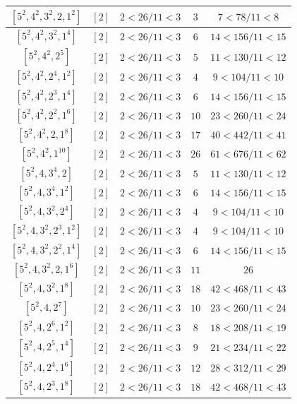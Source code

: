 \documentclass{article}%
\begin{document}
\begin{center}
\begin{longtable}{||c|c|c|c|c||}
$[5^{2}, 4^{2}, 3^{2}, 2, 1^{2}]$ & $[2]$ & $2 < 26/11 < 3$ & $3$ & $7 < 78/11 < 8$ \\ \hline 
$[5^{2}, 4^{2}, 3^{2}, 1^{4}]$ & $[2]$ & $2 < 26/11 < 3$ & $6$ & $14 < 156/11 < 15$ \\ \hline 
$[5^{2}, 4^{2}, 2^{5}]$ & $[2]$ & $2 < 26/11 < 3$ & $5$ & $11 < 130/11 < 12$ \\ \hline 
$[5^{2}, 4^{2}, 2^{4}, 1^{2}]$ & $[2]$ & $2 < 26/11 < 3$ & $4$ & $9 < 104/11 < 10$ \\ \hline 
$[5^{2}, 4^{2}, 2^{3}, 1^{4}]$ & $[2]$ & $2 < 26/11 < 3$ & $6$ & $14 < 156/11 < 15$ \\ \hline 
$[5^{2}, 4^{2}, 2^{2}, 1^{6}]$ & $[2]$ & $2 < 26/11 < 3$ & $10$ & $23 < 260/11 < 24$ \\ \hline 
$[5^{2}, 4^{2}, 2, 1^{8}]$ & $[2]$ & $2 < 26/11 < 3$ & $17$ & $40 < 442/11 < 41$ \\ \hline 
$[5^{2}, 4^{2}, 1^{10}]$ & $[2]$ & $2 < 26/11 < 3$ & $26$ & $61 < 676/11 < 62$ \\ \hline 
$[5^{2}, 4, 3^{4}, 2]$ & $[2]$ & $2 < 26/11 < 3$ & $5$ & $11 < 130/11 < 12$ \\ \hline 
$[5^{2}, 4, 3^{4}, 1^{2}]$ & $[2]$ & $2 < 26/11 < 3$ & $6$ & $14 < 156/11 < 15$ \\ \hline 
$[5^{2}, 4, 3^{2}, 2^{4}]$ & $[2]$ & $2 < 26/11 < 3$ & $4$ & $9 < 104/11 < 10$ \\ \hline 
$[5^{2}, 4, 3^{2}, 2^{3}, 1^{2}]$ & $[2]$ & $2 < 26/11 < 3$ & $4$ & $9 < 104/11 < 10$ \\ \hline 
$[5^{2}, 4, 3^{2}, 2^{2}, 1^{4}]$ & $[2]$ & $2 < 26/11 < 3$ & $6$ & $14 < 156/11 < 15$ \\ \hline 
$[5^{2}, 4, 3^{2}, 2, 1^{6}]$ & $[2]$ & $2 < 26/11 < 3$ & $11$ & $26$ \\ \hline 
$[5^{2}, 4, 3^{2}, 1^{8}]$ & $[2]$ & $2 < 26/11 < 3$ & $18$ & $42 < 468/11 < 43$ \\ \hline 
$[5^{2}, 4, 2^{7}]$ & $[2]$ & $2 < 26/11 < 3$ & $10$ & $23 < 260/11 < 24$ \\ \hline 
$[5^{2}, 4, 2^{6}, 1^{2}]$ & $[2]$ & $2 < 26/11 < 3$ & $8$ & $18 < 208/11 < 19$ \\ \hline 
$[5^{2}, 4, 2^{5}, 1^{4}]$ & $[2]$ & $2 < 26/11 < 3$ & $9$ & $21 < 234/11 < 22$ \\ \hline 
$[5^{2}, 4, 2^{4}, 1^{6}]$ & $[2]$ & $2 < 26/11 < 3$ & $12$ & $28 < 312/11 < 29$ \\ \hline 
$[5^{2}, 4, 2^{3}, 1^{8}]$ & $[2]$ & $2 < 26/11 < 3$ & $18$ & $42 < 468/11 < 43$ \\ \hline 

\end{longtable}
\end{center}
\end{document}
